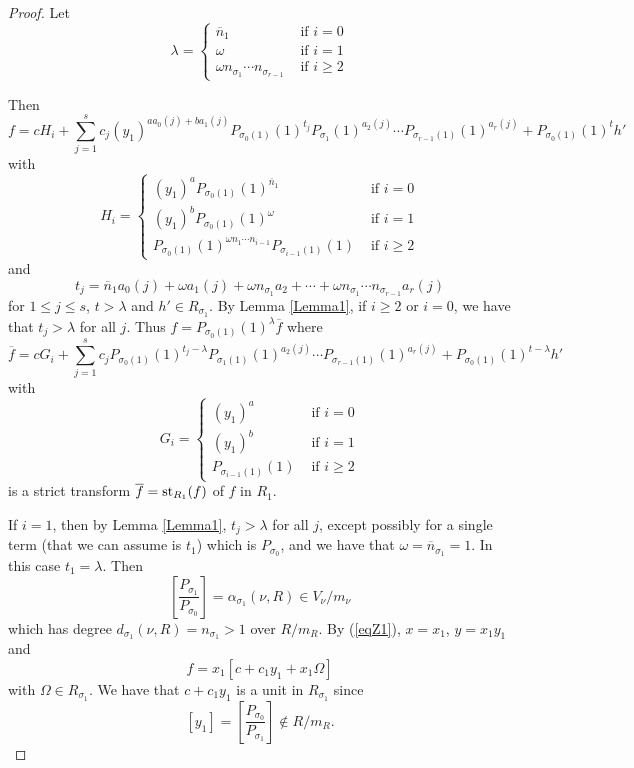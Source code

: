 \documentclass[11pt]{amsart}
\begin{document}
\begin{proof} Let
$$
\lambda=\left\{\begin{array}{ll}
\overline n_1&\mbox{ if }i=0\\
\omega&\mbox{ if }i=1\\
\omega n_{\sigma_1}\cdots n_{\sigma_{r-1}}&\mbox{ if }i\ge 2
\end{array}\right.
$$

Then
$$
f=cH_i+\sum_{j=1}^sc_j(y_1)^{aa_0(j)+ba_1(j)}P_{\sigma_0(1)}(1)^{t_j}P_{\sigma_1}(1)^{a_2(j)}\cdots P_{\sigma_{r-1}(1)}(1)^{a_r(j)}
+P_{\sigma_0(1)}(1)^th'
$$
with 
$$
H_i=\left\{
\begin{array}{ll}
(y_1)^aP_{\sigma_0(1)}(1)^{\overline n_1}&\mbox{ if }i=0\\
(y_1)^bP_{\sigma_0(1)}(1)^{\omega}&\mbox{ if }i=1\\
P_{\sigma_0(1)}(1)^{\omega n_1\cdots n_{i-1}}P_{\sigma_{i-1}(1)}(1)&\mbox{ if }i\ge 2
\end{array}\right.
$$
and
$$
t_j=\overline n_1a_0(j)+\omega a_1(j)+\omega n_{\sigma_1}a_2+\cdots+\omega n_{\sigma_1}\cdots n_{\sigma_{r-1}}a_r(j)
$$
for $1\le j\le s$, $t>\lambda$ and $h'\in R_{\sigma_1}$.
By Lemma \ref{Lemma1}, if $i\ge 2$ or $i=0$, we have that $t_j>\lambda$ for all $j$. Thus $f=P_{\sigma_0(1)}(1)^{\lambda}\overline f$
where
$$
\overline f=cG_i+\sum_{j=1}^sc_jP_{\sigma_0(1)}(1)^{t_j-\lambda}P_{\sigma_1(1)}(1)^{a_2(j)}\cdots P_{\sigma_{r-1}(1)}(1)^{a_r(j)}
+P_{\sigma_0(1)}(1)^{t-\lambda}h'
$$
with 
$$
G_i=\left\{\begin{array}{ll}
(y_1)^a&\mbox{ if }i=0\\
(y_1)^b&\mbox{ if }i=1\\
P_{\sigma_{i-1}(1)}(1)&\mbox{ if }i\ge 2
\end{array}\right.
$$
is a strict transform $\overline f={\rm st}_{R_1}(f)$ of $f$ in $R_1$.


If $i=1$, then by Lemma \ref{Lemma1}, $t_j>\lambda$ for all $j$, except possibly for a single term (that we can assume is $t_1$) which is $P_{\sigma_0}$, and we have that $\omega=\overline n_{\sigma_1}=1$. In this case $t_1=\lambda$. Then
$$
\left[\frac{P_{\sigma_1}}{P_{\sigma_0}}\right]=\alpha_{\sigma_1}(\nu,R)\in V_{\nu}/m_{\nu}
$$
which has degree $d_{\sigma_1}(\nu,R)=n_{\sigma_1}>1$ over $R/m_R$. By (\ref{eqZ1}), $x=x_1$, $y=x_1y_1$ and 
$$
f=x_1[c+c_1y_1+x_1\Omega]
$$
with $\Omega\in R_{\sigma_1}$. We have that $c+c_1y_1$ is a unit in $R_{\sigma_1}$ since 
$$
[y_1]=\left[\frac{P_{\sigma_0}}{P_{\sigma_1}}\right]\not\in R/m_R.
$$




\end{proof}
\end{document}
